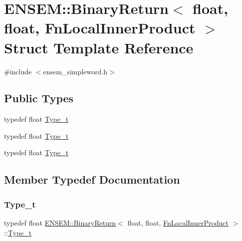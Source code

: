 \hypertarget{structENSEM_1_1BinaryReturn_3_01float_00_01float_00_01FnLocalInnerProduct_01_4}{}\section{E\+N\+S\+EM\+:\+:Binary\+Return$<$ float, float, Fn\+Local\+Inner\+Product $>$ Struct Template Reference}
\label{structENSEM_1_1BinaryReturn_3_01float_00_01float_00_01FnLocalInnerProduct_01_4}


{\ttfamily \#include $<$ensem\+\_\+simpleword.\+h$>$}

\subsection*{Public Types}
\begin{DoxyCompactItemize}
\item 
typedef float \mbox{\hyperlink{structENSEM_1_1BinaryReturn_3_01float_00_01float_00_01FnLocalInnerProduct_01_4_ad3f2d521df09966c47e84ff9e4dc2a95}{Type\+\_\+t}}
\item 
typedef float \mbox{\hyperlink{structENSEM_1_1BinaryReturn_3_01float_00_01float_00_01FnLocalInnerProduct_01_4_ad3f2d521df09966c47e84ff9e4dc2a95}{Type\+\_\+t}}
\item 
typedef float \mbox{\hyperlink{structENSEM_1_1BinaryReturn_3_01float_00_01float_00_01FnLocalInnerProduct_01_4_ad3f2d521df09966c47e84ff9e4dc2a95}{Type\+\_\+t}}
\end{DoxyCompactItemize}


\subsection{Member Typedef Documentation}
\mbox{\label{structENSEM_1_1BinaryReturn_3_01float_00_01float_00_01FnLocalInnerProduct_01_4_ad3f2d521df09966c47e84ff9e4dc2a95}} 
\subsubsection{\texorpdfstring{Type\_t}{Type\_t}\hspace{0.1cm}{\footnotesize\ttfamily [1/3]}}
{\footnotesize\ttfamily typedef float \mbox{\hyperlink{structENSEM_1_1BinaryReturn}{E\+N\+S\+E\+M\+::\+Binary\+Return}}$<$ float, float, \mbox{\hyperlink{structENSEM_1_1FnLocalInnerProduct}{Fn\+Local\+Inner\+Product}} $>$\+::\mbox{\hyperlink{structENSEM_1_1BinaryReturn_3_01float_00_01float_00_01FnLocalInnerProduct_01_4_ad3f2d521df09966c47e84ff9e4dc2a95}{Type\+\_\+t}}}


